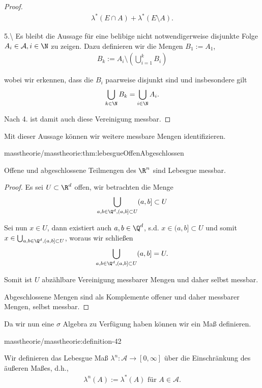 \documentclass[letterpaper,10pt,german]{jupyterBook}
\begin{document}
\begin{proof}
\begin{align*}
\lambda^\ast(E\cap A) + \lambda^\ast(E\setminus A).
\end{align*}
\par
5.\textbackslash{} Es bleibt die Aussage für eine belibige nicht notwendigerweise disjunkte Folge \(A_i\in\mathcal{A}, i\in\N\) zu zeigen. Dazu definieren wir die Mengen \(B_1:=A_1\),
\begin{align*}
B_k := A_i\setminus \left(\bigcup_{i=1}^k B_i  \right)
\end{align*}
\par
wobei wir erkennen, dass die \(B_i\) paarweise disjunkt sind und insbesondere gilt
\begin{align*}
\bigcup_{k\in\N} B_k = \bigcup_{i\in\N} A_i.
\end{align*}
\par
Nach 4. ist damit auch diese Vereinigung messbar.
\end{proof}

\par
Mit dieser Aussage können wir weitere messbare Mengen identifizieren.
\begin{lemma}{}{masstheorie/masstheorie:thm:lebesgueOffenAbgeschlossen}



\par
Offene und abgeschlossene Teilmengen des \(\R^n\) sind Lebesgue messbar.
\end{lemma}

\begin{proof}
 Es sei \(U\subset\R^d\) offen, wir betrachten die Menge
\begin{align*}
\bigcup_{a,b\in \Q^d, (a,b]\subset U} (a,b]\subset U
\end{align*}
\par
Sei nun \(x\in U\), dann existiert auch \(a,b\in\Q^d\), s.d. \(x\in(a,b]\subset U\) und somit \(x\in\bigcup_{a,b\in \Q^d, (a,b]\subset U}\), woraus wir schließen
\begin{align*}
\bigcup_{a,b\in \Q^d, (a,b]\subset U} (a,b] = U.
\end{align*}
\par
Somit ist \(U\) abzählbare Vereinigung messbarer Mengen und daher selbst messbar.

\par
Abgeschlossene Mengen sind als Komplemente offener und daher messbarer Mengen, selbst messbar.
\end{proof}

\par
Da wir nun eine \(\sigma\) Algebra zu Verfügung haben können wir ein Maß definieren.
\begin{definition}{}{masstheorie/masstheorie:definition-42}



\par
Wir definieren das Lebesgue Maß \(\lambda^n:\mathcal{A}\to[0,\infty]\) über die Einschränkung des äußeren Maßes, d.h.,
\begin{align*}
\lambda^n(A):= \lambda^\ast(A)\text{ für } A\in\mathcal{A}.
\end{align*}\end{definition}
\end{document}
